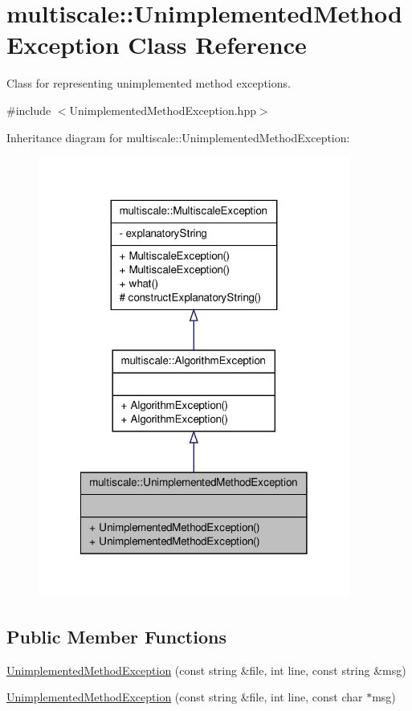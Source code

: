 \hypertarget{classmultiscale_1_1UnimplementedMethodException}{\section{multiscale\-:\-:\-Unimplemented\-Method\-Exception \-Class \-Reference}
\label{classmultiscale_1_1UnimplementedMethodException}
}


\-Class for representing unimplemented method exceptions.  




{\ttfamily \#include $<$\-Unimplemented\-Method\-Exception.\-hpp$>$}



\-Inheritance diagram for multiscale\-:\-:\-Unimplemented\-Method\-Exception\-:\nopagebreak
\begin{figure}[H]
\begin{center}
\leavevmode
\includegraphics[width=290pt]{classmultiscale_1_1UnimplementedMethodException__inherit__graph}
\end{center}
\end{figure}
\subsection*{\-Public \-Member \-Functions}
\begin{DoxyCompactItemize}
\item 
\hyperlink{classmultiscale_1_1UnimplementedMethodException_af3e41ba96ee1376dece07e2f875cbc11}{\-Unimplemented\-Method\-Exception} (const string \&file, int line, const string \&msg)
\item 
\hyperlink{classmultiscale_1_1UnimplementedMethodException_aff17b782e719904081a27badd18740b2}{\-Unimplemented\-Method\-Exception} (const string \&file, int line, const char $\ast$msg)
\end{DoxyCompactItemize}


